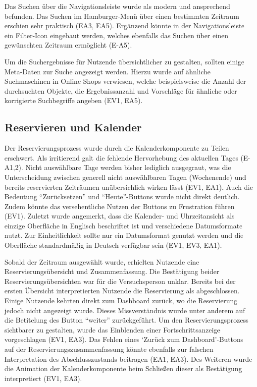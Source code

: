 Das Suchen über die Navigationsleiste wurde als modern und ansprechend befunden. Das Suchen im
Hamburger-Menü über einen bestimmten Zeitraum erschien sehr praktisch (EA3, EA5). Ergänzend könnte
in der Navigationsleiste ein Filter-Icon eingebaut werden, welches ebenfalls das Suchen über einen
gewünschten Zeitraum ermöglicht (E-A5).

Um die Suchergebnisse für Nutzende übersichtlicher zu gestalten, sollten einige Meta-Daten zur
Suche angezeigt werden. Hierzu wurde auf ähnliche Suchmaschinen in Online-Shops verwiesen, welche
beispielsweise die Anzahl der durchsuchten Objekte, die Ergebnissanzahl und Vorschläge für ähnliche
oder korrigierte Suchbegriffe angeben (EV1, EA5).

\subsection{Reservieren und Kalender}
Der Reservierungsprozess wurde durch die Kalenderkomponente zu Teilen erschwert. Als irritierend
galt die fehlende Hervorhebung des aktuellen Tages (E-A1,2). Nicht auswählbare Tage werden bisher
lediglich ausgegraut, was die Unterscheidung zwischen generell nicht auswählbaren Tagen (Wochenende)
und bereits reservierten Zeiträumen unübersichlich wirken lässt (EV1, EA1). Auch die Bedeutung
\enquote{Zurücksetzen} und \enquote{Heute}-Buttons wurde nicht direkt deutlich. Zudem könnte das
versehentliche Nutzen der Buttons zu Frustration führen (EV1). Zuletzt wurde angemerkt, dass die
Kalender- und Uhrzeitansicht als einzige Oberfläche in Englisch beschriftet ist und verschiedene
Datumsformate nutzt. Zur Einheitlichkeit sollte nur ein Datumsformat genutzt werden und die
Oberfläche standardmäßig in Deutsch verfügbar sein (EV1, EV3, EA1).

Sobald der Zeitraum ausgewählt wurde, erhielten Nutzende eine Reservierungsübersicht und
Zusammenfassung. Die Bestätigung beider Reservierungsübersichten war für die Versuchsperson unklar.
Bereits bei der ersten Übersicht interpretierten Nutzende die Reservierung als abgeschlossen. Einige
Nutzende kehrten direkt zum Dashboard zurück, wo die Reservierung jedoch nicht angezeigt wurde.
Dieses Missverständnis wurde unter anderem auf die Betitelung des Button \enquote{weiter}
zurückgeführt. Um den Reservierungsprozess sichtbarer zu gestalten, wurde das Einblenden einer
Fortschrittsanzeige vorgeschlagen (EV1, EA3). Das Fehlen eines \enquote*{Zurück zum Dashboard}-Buttons
auf der Reservierungszusammenfassung könnte ebenfalls zur falschen Interpretation des
Abschlusszustands beitragen (EA1, EA3). Des Weiteren wurde die Animation der Kalenderkomponente beim
Schließen dieser als Bestätigung interpretiert (EV1, EA3).

